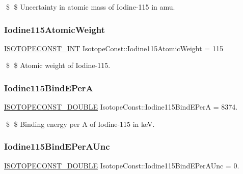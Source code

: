 \$ \$ Uncertainty in atomic mass of Iodine-\/115 in amu. \mbox{\label{group___isotope_const-_iodine-_i115_gae242095b05389858b4f5bcc13c2cc44f}} 
\subsubsection{\texorpdfstring{Iodine115\+Atomic\+Weight}{Iodine115AtomicWeight}}
{\footnotesize\ttfamily \mbox{\hyperlink{group___isotope_const-_macros_ga5f18360b3e99483a35c32d789e62621c}{I\+S\+O\+T\+O\+P\+E\+C\+O\+N\+S\+T\+\_\+\+I\+NT}} Isotope\+Const\+::\+Iodine115\+Atomic\+Weight = 115}

\$ \$ Atomic weight of Iodine-\/115. \mbox{\label{group___isotope_const-_iodine-_i115_ga861f111453dd9a0918219ba1f399f8aa}} 
\subsubsection{\texorpdfstring{Iodine115\+Bind\+E\+PerA}{Iodine115BindEPerA}}
{\footnotesize\ttfamily \mbox{\hyperlink{group___isotope_const-_macros_ga8f45a7272ce02c0b4c65c44636ed719a}{I\+S\+O\+T\+O\+P\+E\+C\+O\+N\+S\+T\+\_\+\+D\+O\+U\+B\+LE}} Isotope\+Const\+::\+Iodine115\+Bind\+E\+PerA = 8374.}

\$ \$ Binding energy per A of Iodine-\/115 in keV. \mbox{\label{group___isotope_const-_iodine-_i115_gaecf5fff09df769b21d4c3f349a53b480}} 
\subsubsection{\texorpdfstring{Iodine115\+Bind\+E\+Per\+A\+Unc}{Iodine115BindEPerAUnc}}
{\footnotesize\ttfamily \mbox{\hyperlink{group___isotope_const-_macros_ga8f45a7272ce02c0b4c65c44636ed719a}{I\+S\+O\+T\+O\+P\+E\+C\+O\+N\+S\+T\+\_\+\+D\+O\+U\+B\+LE}} Isotope\+Const\+::\+Iodine115\+Bind\+E\+Per\+A\+Unc = 0.}

